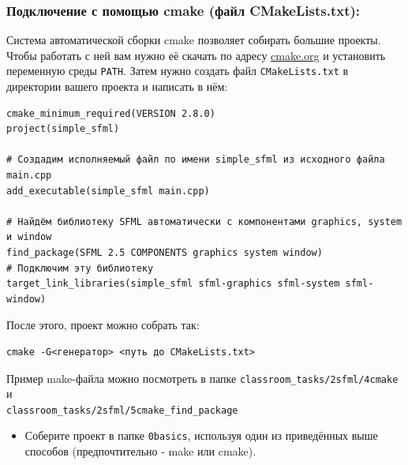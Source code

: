 \documentclass{article}
\begin{document}
\subsubsection*{Подключение с помощью cmake (файл CMakeLists.txt):}
Система автоматической сборки cmake позволяет собирать большие проекты. Чтобы работать с ней вам нужно её скачать по адресу \href{https://cmake.org/}{cmake.org} и установить переменную среды \texttt{PATH}. Затем нужно создать файл \texttt{CMakeLists.txt} в директории вашего проекта и написать в нём:
\begin{verbatim}
cmake_minimum_required(VERSION 2.8.0)
project(simple_sfml)
 
# Создадим исполняемый файл по имени simple_sfml из исходного файла main.cpp
add_executable(simple_sfml main.cpp)

# Найдём библиотеку SFML автоматически с компонентами graphics, system и window
find_package(SFML 2.5 COMPONENTS graphics system window)
# Подключим эту библиотеку
target_link_libraries(simple_sfml sfml-graphics sfml-system sfml-window)
\end{verbatim}

После этого, проект можно собрать так:
\begin{verbatim}
cmake -G<генератор> <путь до CMakeLists.txt>
\end{verbatim}

Пример make-файла можно посмотреть в папке \texttt{classroom\_tasks/2sfml/4cmake} и\\ \texttt{classroom\_tasks/2sfml/5cmake\_find\_package}\\
\begin{itemize}
\item Соберите проект в папке \texttt{0basics}, используя один из приведённых выше способов (предпочтительно - make или cmake). 
\end{itemize}
\newpage
\end{document}
